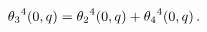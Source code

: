 \[{\mathop{\theta_{3}\/}\nolimits^{4}}\!\left(0,q\right)={\mathop{\theta_{2}\/}%
\nolimits^{4}}\!\left(0,q\right)+{\mathop{\theta_{4}\/}\nolimits^{4}}\!\left(0%
,q\right).\]